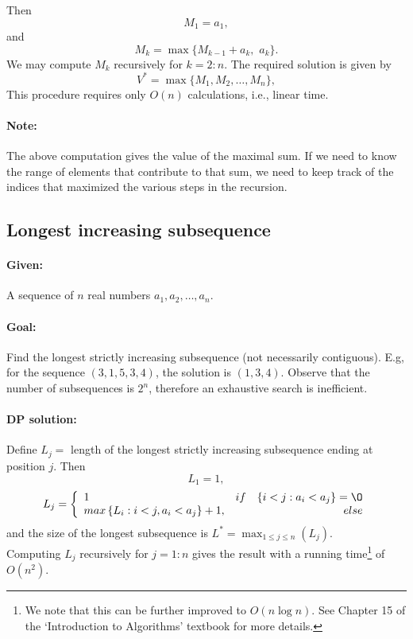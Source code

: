 Then $${M_1} = {a_1},$$ and
$${M_k} = \max \{ {M_{k - 1}} + {a_k},\,\,{a_k}\} .$$
We may compute ${M_k}$ recursively for $k = 2:n$. The required solution is given by
$${V^*} = \max \{ {M_1},{M_2}, \ldots ,{M_n}\} ,$$
This procedure requires only $O(n)$ calculations, i.e., linear time.

\paragraph{Note:}  The above computation gives the value of the maximal sum. If we need to know the range of elements that contribute to that sum, we need to keep track of the indices that maximized the various steps in the recursion.

\subsection{Longest increasing subsequence}

\paragraph{Given:}   A sequence of $n$ real numbers ${a_1},{a_2}, \ldots ,{a_n}$.
\paragraph{Goal:}   Find the longest strictly increasing subsequence (not necessarily contiguous).
E.g, for the sequence $(3,1,5,3,4)$, the solution is $(1,3,4)$.
Observe that the number of subsequences is ${2^n}$, therefore an exhaustive search is inefficient.

\paragraph{DP solution:}
Define  ${L_j} = $ {length of the longest strictly increasing subsequence ending at position $j$}.
Then $${L_1} = 1,$$
$$L_{j} = \left\{\begin{array}{lr}
  1 & if\quad  \{i<j: a_{i}<a_{j}\}=\O\\
  max \left\{{L_{i} : i<j, a_{i}<a_{j}}\right\}+1,& else\\ 
  
  \end{array}\right.$$
and the size of the longest subsequence is $L^* = {\max _{1 \le j \le n}}({L_j}).$
\\
Computing ${L_j}$ recursively for $j = 1:n$ gives the result with a running time\footnote{We note that this can be further improved to $O(n\log n)$. See Chapter 15 of
the `Introduction to Algorithms' textbook for more details.} of $O({n^2})$.


